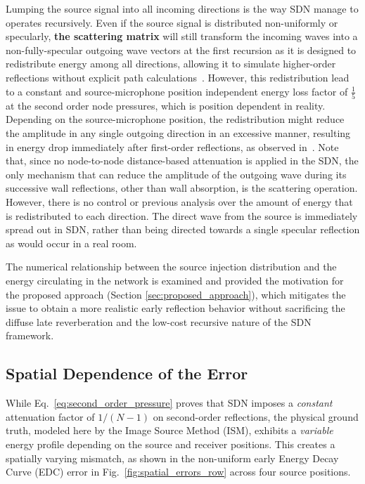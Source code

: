 \documentclass[journal]{IEEEtran}
\begin{document}
Lumping the source signal into all incoming directions is the way SDN manage to operates recursively. 
Even if the source signal is distributed non-uniformly or specularly, \textbf{the scattering matrix} will still transform the incoming waves into a non-fully-specular outgoing wave vectors at the first recursion as it is designed to redistribute energy among all directions, allowing it to simulate higher-order reflections without explicit path calculations~\cite{SDNjournal}. 
However, this redistribution lead to a constant and source-microphone position independent energy loss factor of $\frac{1}{5}$ at the second order node pressures, which is position dependent in reality. 
Depending on the source-microphone position, the redistribution might reduce the amplitude in any single outgoing direction in an excessive manner, resulting in energy drop immediately after first-order reflections, as observed in~\cite{SDNwaspaa}.
Note that, since no node-to-node distance-based attenuation is applied in the SDN, the only mechanism that can reduce the amplitude of the outgoing wave during its successive wall reflections, other than wall absorption, is the scattering operation.
However, there is no control or previous analysis over the amount of
energy that is redistributed to each direction.    
The direct wave from the source is immediately spread out in SDN, rather than being directed towards a single specular reflection as would occur in a real room. 

The numerical relationship between the source injection distribution and the energy circulating in the network is examined and provided the motivation for the proposed approach (Section \ref{sec:proposed_approach}), which mitigates the issue to obtain a more realistic early reflection behavior without sacrificing the diffuse late reverberation and the low-cost recursive nature of the SDN framework.

\subsection{Spatial Dependence of the Error}
\label{sec:spatial_dependence}

While Eq.~\eqref{eq:second_order_pressure} proves that SDN imposes a \emph{constant} attenuation factor of $1/(N-1)$ on second-order reflections, the physical ground truth, modeled here by the Image Source Method (ISM), exhibits a \emph{variable}
energy profile depending on the source and receiver positions. 
This creates a spatially varying mismatch, as shown in the non-uniform early Energy Decay Curve (EDC) error in Fig.~\ref{fig:spatial_errors_row} across four source positions.
\end{document}
